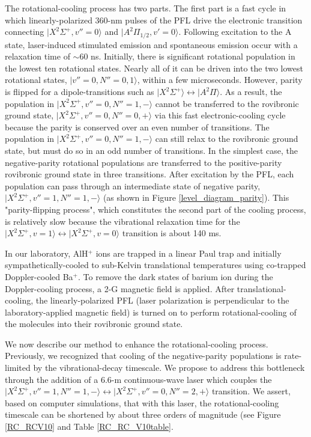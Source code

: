 \documentclass[nofootinbib,aip,jcp,reprint]{revtex4-1}
\begin{document}
The rotational-cooling process has two parts. The first part is a fast cycle in which linearly-polarized 360-nm pulses of the PFL drive the electronic transition connecting $\lvert X^2\Sigma^+, v''=0\rangle$ and $\lvert A^{2}\Pi_{1/2}, v'=0\rangle$. Following excitation to the A state, laser-induced stimulated emission and spontaneous emission occur with a relaxation time of $\sim$60 ns.  Initially, there is significant rotational population in the lowest ten rotational states. Nearly all of it can be driven into the two lowest rotational states, $\lvert v''=0, N''=0,1\rangle$, within a few microseconds. However, parity is flipped for a dipole-transitions such as $\lvert X^2\Sigma^+\rangle \leftrightarrow \lvert A^2\Pi\rangle$. As a result, the population in $\lvert X^2\Sigma^+, v''=0, N''=1, -\rangle$ cannot be transferred to the rovibronic ground state, $\lvert X^2\Sigma^+, v''=0, N''=0, +\rangle$ via this fast electronic-cooling cycle because the parity is conserved over an even number of transitions. The population in $\lvert X^2\Sigma^+, v''=0, N''=1, -\rangle$ can still relax to the rovibronic ground state, but must do so in an odd number of transitions. In the simplest case, the negative-parity rotational populations are transferred to the positive-parity rovibronic ground state in three transitions. After excitation by the PFL, each population can pass through an intermediate state of negative parity, $\lvert X^2\Sigma^+, v''=1, N''=1, -\rangle$ (as shown in Figure \ref{level_diagram_parity}). This "parity-flipping process", which constitutes the second part of the cooling process, is relatively slow because the vibrational relaxation time for the $\lvert X^2\Sigma^+, v=1\rangle \leftrightarrow \lvert X^2\Sigma^+, v=0\rangle$ transition is about 140 ms.

In our laboratory, AlH$^+$ ions are trapped in a linear Paul trap and initially sympathetically-cooled to sub-Kelvin translational temperatures using co-trapped Doppler-cooled Ba$^+$. To remove the dark states of barium ion during the Doppler-cooling process, a 2-G magnetic field is applied. After translational-cooling, the linearly-polarized PFL (laser polarization is perpendicular to the laboratory-applied magnetic field) is turned on to perform rotational-cooling of the molecules into their rovibronic ground state.

We now describe our method to enhance the rotational-cooling process. Previously, we recognized that cooling of the negative-parity populations is rate-limited by the vibrational-decay timescale. We propose to address this bottleneck through the addition of a 6.6-{\micro}m continuous-wave laser which couples the $\lvert X^2\Sigma^+, v''=1, N''=1, -\rangle \leftrightarrow \lvert X^2\Sigma^+, v''=0, N''=2, +\rangle$ transition. We assert, based on computer simulations, that with this laser, the rotational-cooling timescale can be shortened by about three orders of magnitude (see Figure \ref{RC_RCV10} and Table \ref{RC_RC_V10table}.
\end{document}
